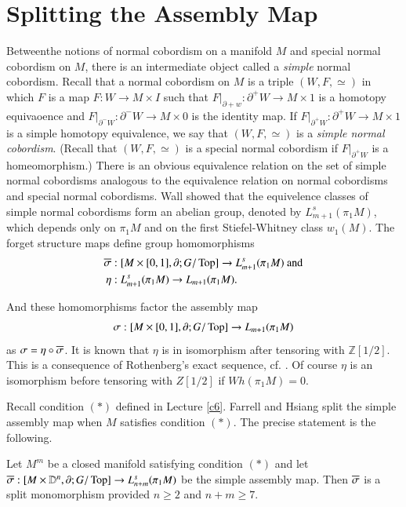 \chapter{Splitting the Assembly Map}\label{c7}

Between\pageoriginale the notions of normal cobordism on a manifold
$M$ and special normal cobordism on $M$, there is an intermediate
object called a \textit{simple} normal cobordism. Recall that a normal
cobordism on $M$ is a triple $(W, F, \simeq)$ in which $F$ is a map
$F: W \to M \times I$ such that $F|_{\partial +w}: \partial^+ W \to M
\times 1$ is a homotopy equivaoence and $F|_{\partial ^- W}: \partial
^- W \to M \times 0$ is the identity map. If $F|_{\partial^+ W}:
\partial^+ W \to  M \times 1$ is a simple homotopy equivalence, we say
that $(W, F, \simeq)$ is a \textit{simple normal cobordism}. (Recall
that $(W, F, \simeq)$ is a special normal cobordism if $F|_{\partial
  ^+ W}$ is a homeomorphism.) There is an obvious equivalence relation
on the set of simple normal cobordisms analogous to the equivalence
relation on normal cobordisms and special normal cobordisms. Wall
\cite{96} showed that the equivelence classes of simple normal
cobordisms form an abelian group, denoted by $L^s_{m+1} (\pi_1 M)$,
which depends only on $\pi_1 M$ and on the first Stiefel-Whitney class
$w_1 (M)$. The forget structure maps define group homomorphisms
\begin{align*}
  \overline{\sigma} & : [M \times [0,1], \partial; G/\operatorname{Top}]\to
  L^s_{m+1} (\pi_1 M) ~\text{and}\\
\eta & : L_{m+1}^s (\pi_1 M) \to L_{m+1} (\pi_1 M).
\end{align*}

And these homomorphisms factor the assembly map
$$
\sigma : [M \times [0, 1], \partial; G/\operatorname{Top}]\to L_{m+1}(\pi_1 M)
$$
as $\sigma = \eta \circ \overline{\sigma}$. It is known that $\eta$ is in
isomorphism after tensoring with $\mathbb{Z}[1/2]$. This is a
consequence of Rothenberg's exact sequence, cf. \cite[p. 248]{96}. Of
course $\eta$ is an isomorphism before tensoring with $Z[1/2]$ if $Wh
(\pi_1 M)=0$. 

Recall condition $(*)$ defined in Lecture \ref{c6}. Farrell and Hsiang
\cite{30} split the simple assembly map when $M$ satisfies condition
$(*)$. The precise statement is the following.

\begin{thm}\label{c7:thm7.1}
  Let $M^m$ be a closed manifold satisfying condition $(*)$ and let
  $\overline{\sigma} : [M \times \mathbb{D}^n, \partial; G/\operatorname{Top}]\to
  L_{n+m}^s(\pi_1 M)$ be the simple assembly map. Then $\overline{\sigma}$
  is a split monomorphism provided $n \geq 2$ and $n+ m \geq 7$.
\end{thm}

